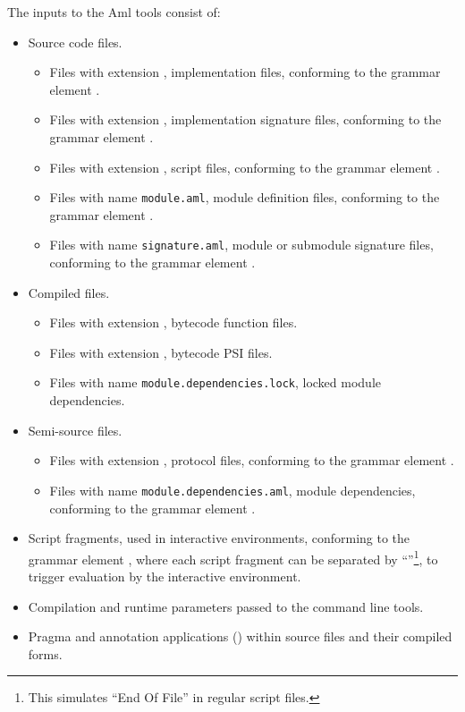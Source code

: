The inputs to the Aml tools consist of: 
\begin{itemize}
  \item Source code files. 
    \begin{itemize}
      \item Files with extension , implementation files, conforming to the grammar element . 
      \item Files with extension , implementation signature files, conforming to the grammar element . 
      \item Files with extension , script files, conforming to the grammar element . 
      \item Files with name \lstinline[deletekeywords={module}]!module.aml!, module definition files, conforming to the grammar element . 
      \item Files with name \lstinline[deletekeywords={signature}]!signature.aml!, module or submodule signature files, conforming to the grammar element . 
    \end{itemize}
  \item Compiled files. 
    \begin{itemize}
      \item Files with extension , bytecode function files. 
      \item Files with extension , bytecode PSI files. 
      \item Files with name \lstinline[deletekeywords={module}]!module.dependencies.lock!, locked module dependencies. 
    \end{itemize}
  \item Semi-source files. 
    \begin{itemize}
      \item Files with extension , protocol files, conforming to the grammar element . 
      \item Files with name \lstinline[deletekeywords={module}]!module.dependencies.aml!, module dependencies, conforming to the grammar element . 
    \end{itemize}
  \item Script fragments, used in interactive environments, conforming to the grammar element , where each script fragment can be separated by ``\code{;;}''\footnote{This simulates ``End Of File'' in regular script files.}, to trigger evaluation by the interactive environment. 
  \item Compilation and runtime parameters passed to the command line tools. 
  \item Pragma and annotation applications () within source files and their compiled forms. 
\end{itemize}

